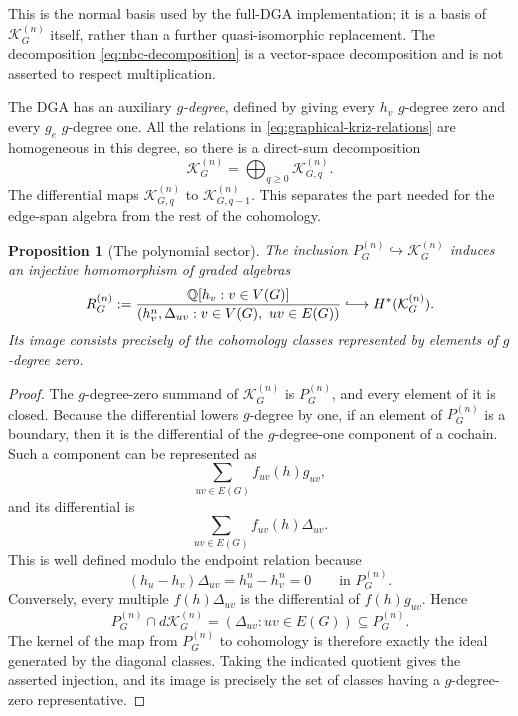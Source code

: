 \documentclass[11pt]{amsart}
\theoremstyle{plain}
\newtheorem{proposition}[theorem]{Proposition}
\theoremstyle{definition}
\theoremstyle{remark}
\newcommand{\Q}{\mathbb{Q}}
\begin{document}
This is the normal basis used by the full-DGA implementation; it is a basis of
$\mathcal K_G^{(n)}$ itself, rather than a further quasi-isomorphic
replacement.  The decomposition \eqref{eq:nbc-decomposition} is a
vector-space decomposition and is not asserted to respect multiplication.

The DGA has an auxiliary \emph{$g$-degree}, defined by giving every $h_v$
$g$-degree zero and every $g_e$ $g$-degree one.  All the relations in
\eqref{eq:graphical-kriz-relations} are homogeneous in this degree, so there is
a direct-sum decomposition
\[
  \mathcal K_G^{(n)}=\bigoplus_{q\geq0}\mathcal K_{G,q}^{(n)}.
\]
The differential maps $\mathcal K_{G,q}^{(n)}$ to
$\mathcal K_{G,q-1}^{(n)}$.  This separates the part needed for the edge-span
algebra from the rest of the cohomology.

\begin{proposition}[The polynomial sector]
\label{prop:polynomial-sector}
The inclusion $P_G^{(n)}\hookrightarrow\mathcal K_G^{(n)}$ induces an
injective homomorphism of graded algebras
\begin{equation}\label{eq:polynomial-sector}
  R_G^{(n)}
  :=\frac{\Q[h_v:v\in V(G)]}
  {(h_v^n,\Delta_{uv}:v\in V(G),\ uv\in E(G))}
  \lhook\joinrel\longrightarrow H^*(\mathcal K_G^{(n)}).
\end{equation}
Its image consists precisely of the cohomology classes represented by
elements of $g$-degree zero.
\end{proposition}

\begin{proof}
The $g$-degree-zero summand of $\mathcal K_G^{(n)}$ is $P_G^{(n)}$, and every
element of it is closed.  Because the differential lowers $g$-degree by one,
if an element of $P_G^{(n)}$ is a boundary, then it is the differential of the
$g$-degree-one component of a cochain.  Such a component can be represented as
\[
  \sum_{uv\in E(G)}f_{uv}(h)g_{uv},
\]
and its differential is
\[
  \sum_{uv\in E(G)}f_{uv}(h)\Delta_{uv}.
\]
This is well defined modulo the endpoint relation because
\[
  (h_u-h_v)\Delta_{uv}
  =h_u^n-h_v^n
  =0
  \qquad\text{in }P_G^{(n)}.
\]
Conversely, every multiple $f(h)\Delta_{uv}$ is the differential of
$f(h)g_{uv}$.  Hence
\[
  P_G^{(n)}\cap d\mathcal K_G^{(n)}
  =(\Delta_{uv}:uv\in E(G))\subseteq P_G^{(n)}.
\]
The kernel of the map from $P_G^{(n)}$ to cohomology is therefore exactly the
ideal generated by the diagonal classes.  Taking the indicated quotient gives
the asserted injection, and its image is precisely the set of classes having
a $g$-degree-zero representative.
\end{proof}
\end{document}
